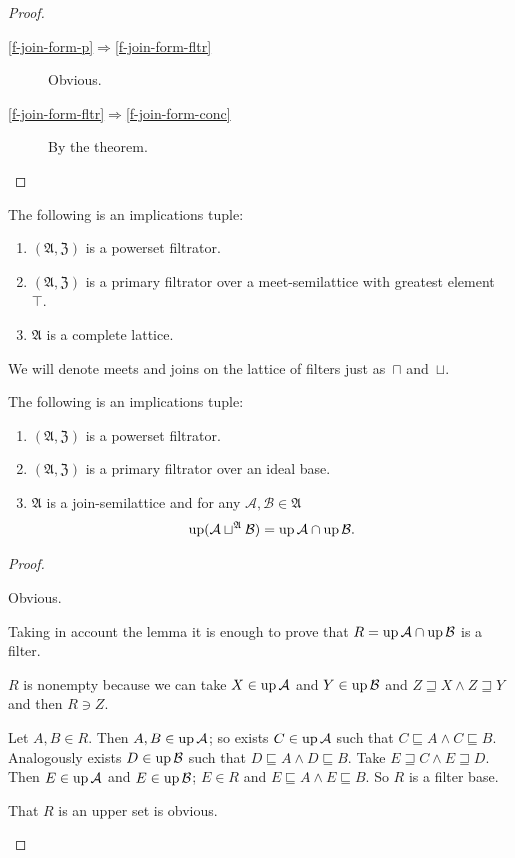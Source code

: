 \begin{proof}
~
\begin{description}
\item [{\ref{f-join-form-p}$\Rightarrow$\ref{f-join-form-fltr}}] Obvious.
\item [{\ref{f-join-form-fltr}$\Rightarrow$\ref{f-join-form-conc}}] By
the theorem.
\end{description}
\end{proof}
\begin{cor}
\label{filt-is-complete}The following is an implications tuple:
\begin{enumerate}
\item $(\mathfrak{A},\mathfrak{Z})$ is a powerset filtrator.
\item $(\mathfrak{A},\mathfrak{Z})$ is a primary filtrator over a meet-semilattice
with greatest element~$\top$.
\item $\mathfrak{A}$ is a complete lattice.
\end{enumerate}
\end{cor}

We will denote meets and joins on the lattice of filters just as~$\sqcap$ and~$\sqcup$.
\begin{prop}\label{filt-meet-form}
The following is an implications tuple:
\begin{enumerate}
  \item\label{fjoin-ex-pow} $(\mathfrak{A},\mathfrak{Z})$ is a powerset filtrator.
  \item\label{fjoin-ex-flt}  $(\mathfrak{A},\mathfrak{Z})$ is a primary filtrator
    over an ideal base.
  \item\label{fjoin-ex-res}  $\mathfrak{A}$ is a join-semilattice and for
    any $\mathcal{A},\mathcal{B}\in\mathfrak{A}$
\[
\operatorname{up}(\mathcal{A}\sqcup^{\mathfrak{A}}\mathcal{B})=\operatorname{up}\mathcal{A}\cap\operatorname{up}\mathcal{B}.
\]
\end{enumerate}
\end{prop}

\begin{proof}
~
\begin{widedisorder}
\item[\ref{fjoin-ex-pow}$\Rightarrow$\ref{fjoin-ex-flt}]
  Obvious.
\item[\ref{fjoin-ex-flt}$\Rightarrow$\ref{fjoin-ex-res}]
  Taking in account the lemma it is enough to prove that $R = \operatorname{up}
  \mathcal{A} \cap \operatorname{up} \mathcal{B}$ is a filter.

  $R$ is nonempty because we can take $X \in \operatorname{up} \mathcal{A}$ and $Y \in
  \operatorname{up} \mathcal{B}$ and $Z\sqsupseteq X\land Z\sqsupseteq Y$ and then $R \ni Z$.

  Let $A, B \in R$. Then $A, B \in \operatorname{up} \mathcal{A}$; so exists $C \in
  \operatorname{up} \mathcal{A}$ such that $C \sqsubseteq A \land C \sqsubseteq B$.
  Analogously exists $D \in \operatorname{up} \mathcal{B}$ such that $D \sqsubseteq A \land
  D \sqsubseteq B$. Take $E\sqsupseteq C\land E\sqsupseteq D$. Then $E \in \operatorname{up}
  \mathcal{A}$ and $E \in \operatorname{up} \mathcal{B}$; $E \in R$ and $E \sqsubseteq A \land
  E \sqsubseteq B$. So $R$ is a filter base.

  That $R$ is an upper set is obvious.
\end{widedisorder}
\end{proof}

